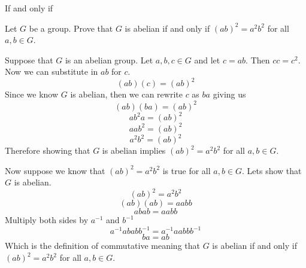 If and only if

Let $G$ be a group.  Prove that $G$ is abelian if and only if $(ab)^2=a^2b^2$ for all $a,b\in G$. 

\begin{solution}
Suppose that $G$ is an abelian group. Let $a,b,c \in G$ and let $c = ab$. Then $cc = c^2$. Now we can substitute in $ab$ for $c$.
$$(ab)(c) = (ab)^2 $$ Since we know $G$ is abelian, then we can rewrite $c$ as $ba$ giving us $$(ab)(ba) = (ab)^2 $$ $$ab^2a = (ab)^2$$ $$ aab^2 = (ab)^2$$ $$a^2b^2 = (ab)^2$$ Therefore showing that $G$ is abelian implies $(ab)^2=a^2b^2$ for all $a,b\in G$.

Now suppose we know that $(ab)^2=a^2b^2$ is true for all $a,b\in G$. Lets show that $G$ is abelian.
$$ (ab)^2 = a^2b^2 $$
$$(ab)(ab) = aabb $$
$$abab = aabb $$ Multiply both sides by $a^{-1}$ and $b^{-1}$
$$a^{-1}abab b^{-1} = a^{-1}aabb b^{-1}$$
$$ ba = ab$$
Which is the definition of commutative meaning that $G$ is abelian if and only if $(ab)^2=a^2b^2$ for all $a,b\in G$.
\end{solution}